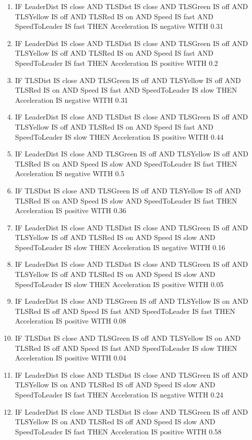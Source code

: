 \begin{enumerate}
	\item IF LeaderDist IS close AND TLSDist IS close AND TLSGreen IS off AND TLSYellow IS off AND TLSRed IS on AND Speed IS fast AND SpeedToLeader IS fast THEN Acceleration IS negative WITH 0.31
	\item IF LeaderDist IS close AND TLSDist IS close AND TLSGreen IS off AND TLSYellow IS off AND TLSRed IS on AND Speed IS fast AND SpeedToLeader IS fast THEN Acceleration IS positive WITH 0.2
	\item IF TLSDist IS close AND TLSGreen IS off AND TLSYellow IS off AND TLSRed IS on AND Speed IS fast AND SpeedToLeader IS slow THEN Acceleration IS negative WITH 0.31
	\item IF LeaderDist IS close AND TLSDist IS close AND TLSGreen IS off AND TLSYellow IS off AND TLSRed IS on AND Speed IS fast AND SpeedToLeader IS slow THEN Acceleration IS positive WITH 0.44
	\item IF LeaderDist IS close AND TLSGreen IS off AND TLSYellow IS off AND TLSRed IS on AND Speed IS slow AND SpeedToLeader IS fast THEN Acceleration IS negative WITH 0.5
	\item IF TLSDist IS close AND TLSGreen IS off AND TLSYellow IS off AND TLSRed IS on AND Speed IS slow AND SpeedToLeader IS fast THEN Acceleration IS positive WITH 0.36
	\item IF LeaderDist IS close AND TLSDist IS close AND TLSGreen IS off AND TLSYellow IS off AND TLSRed IS on AND Speed IS slow AND SpeedToLeader IS slow THEN Acceleration IS negative WITH 0.16
	\item IF LeaderDist IS close AND TLSDist IS close AND TLSGreen IS off AND TLSYellow IS off AND TLSRed IS on AND Speed IS slow AND SpeedToLeader IS slow THEN Acceleration IS positive WITH 0.05
	\item IF LeaderDist IS close AND TLSGreen IS off AND TLSYellow IS on AND TLSRed IS off AND Speed IS fast AND SpeedToLeader IS fast THEN Acceleration IS positive WITH 0.08
	\item IF TLSDist IS close AND TLSGreen IS off AND TLSYellow IS on AND TLSRed IS off AND Speed IS fast AND SpeedToLeader IS slow THEN Acceleration IS positive WITH 0.04
	\item IF LeaderDist IS close AND TLSDist IS close AND TLSGreen IS off AND TLSYellow IS on AND TLSRed IS off AND Speed IS slow AND SpeedToLeader IS fast THEN Acceleration IS negative WITH 0.24
	\item IF LeaderDist IS close AND TLSDist IS close AND TLSGreen IS off AND TLSYellow IS on AND TLSRed IS off AND Speed IS slow AND SpeedToLeader IS fast THEN Acceleration IS positive WITH 0.58

\end{enumerate}
